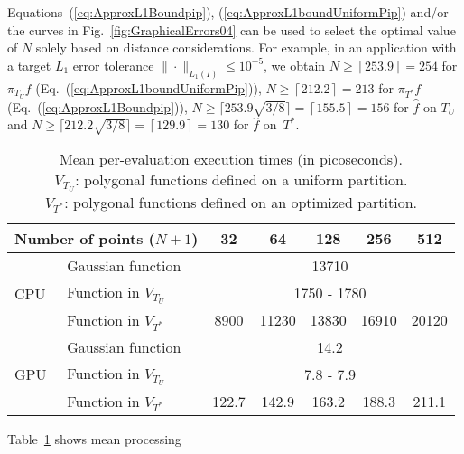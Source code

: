 \documentclass[a4paper,english]{IEEEtran}
\providecommand{\tabularnewline}{\\}
\begin{document}
Equations~(\ref{eq:ApproxL1Boundpip}), (\ref{eq:ApproxL1boundUniformPip})
and/or the curves in Fig.~\ref{fig:GraphicalErrors04} can be used
to select the optimal value of $N$ solely based on distance considerations.
For example, in an application with a target ${L_{1}}$ error tolerance
$\|\cdot\|_{{L_{1}}(I)}\leq10^{-5}$, we obtain $N\ge\left\lceil 253.9\right\rceil =254$
for ${\pi_{{T}_{U}}} f$ (Eq.~(\ref{eq:ApproxL1boundUniformPip})), $N\ge\left\lceil 212.2\right\rceil =213$
for ${\pi_{{T}^{\ast}}} f$ (Eq.~(\ref{eq:ApproxL1Boundpip})), $N\ge\lceil253.9\sqrt{3/8}\rceil=\left\lceil 155.5\right\rceil =156$
for ${\hat{f}}$ on ${{T}_{U}}$ and $N\ge\lceil212.2\sqrt{3/8}\rceil=\left\lceil 129.9\right\rceil =130$
for ${\hat{f}}$ on~${{T}^{\ast}}$. 

\begin{table}[t]
\caption{\label{tab:Mean-per-evaluation-execution}Mean per-evaluation execution
times (in picoseconds).\protect \\
$V_{{T}_{U}}$: polygonal functions defined on a uniform partition.\protect \\
$V_{{T}^{\ast}}$: polygonal functions defined on an optimized partition.}

\centering{}\begin{tabular}{|l|l|c|c|c|c|c|}
\hline 
\multicolumn{2}{|l|}{{\footnotesize{}Number of points ($N+1$)}} & {\footnotesize{}32} & {\footnotesize{}64} & {\footnotesize{}128} & {\footnotesize{}256} & {\footnotesize{}512}\tabularnewline
\hline 
\hline 
\multirow{3}{*}{{\footnotesize{}CPU}} & {\footnotesize{}Gaussian function } & \multicolumn{5}{c|}{{\footnotesize{}13710}}\tabularnewline
\cline{2-7} 
 & {\footnotesize{}Function in $V_{{T}_{U}}$} & \multicolumn{5}{c|}{{\footnotesize{}1750 - 1780}}\tabularnewline
\cline{2-7} 
 & {\footnotesize{}Function in $V_{{T}^{\ast}}$} & {\footnotesize{}8900} & {\footnotesize{}11230} & {\footnotesize{}13830} & {\footnotesize{}16910} & {\footnotesize{}20120}\tabularnewline
\hline 
\multirow{3}{*}{{\footnotesize{}GPU}} & {\footnotesize{}Gaussian function} & \multicolumn{5}{c|}{{\footnotesize{}14.2}}\tabularnewline
\cline{2-7} 
 & {\footnotesize{}Function in $V_{{T}_{U}}$} & \multicolumn{5}{c|}{{\footnotesize{}7.8 - 7.9}}\tabularnewline
\cline{2-7} 
 & {\footnotesize{}Function in $V_{{T}^{\ast}}$} & {\footnotesize{}122.7} & {\footnotesize{}142.9} & {\footnotesize{}163.2} & {\footnotesize{}188.3} & {\footnotesize{}211.1}\tabularnewline
\hline 
\end{tabular}
\end{table}
Table~\ref{tab:Mean-per-evaluation-execution} shows mean processing
\end{document}
